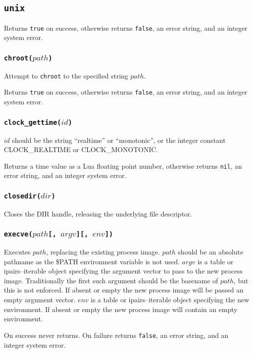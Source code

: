 \documentclass[11pt, oneside]{memoir}
\newcommand*{\true}[0]{\texttt{true}\xspace}
\newcommand*{\false}[0]{\texttt{false}\xspace}
\newcommand*{\nil}[0]{\texttt{nil}\xspace}
\newcommand*{\syscall}[1]{\texttt{#1}\xspace}
\newcommand*{\fn}[1]{\texttt{#1}\xspace}
\newcounter{toccols}
\newenvironment{Module}[1]{
	\subsection{\texttt{#1}}
	\addtocontents{toc}{
		\protect\begin{multicols}{\value{toccols}}
	}
}{
	\addtocontents{toc}{\protect\end{multicols}}
}
\begin{document}
\begin{Module}{unix}
Returns \true on success, otherwise returns \false, an error string, and an integer system error.

\subsubsection[\fn{chroot}]{\fn{chroot($path$)}}

Attempt to \syscall{chroot} to the specified string $path$.

Returns \true on success, otherwise returns \false, an error string, and an integer system error.

\subsubsection[\fn{clock\_gettime}]{\fn{clock\_gettime($id$)}}

$id$ should be the string ``realtime'' or ``monotonic'', or the integer constant CLOCK\_REALTIME or CLOCK\_MONOTONIC.

Returns a time value as a Lua floating point number, otherwise returns \nil, an error string, and an integer system error.

\subsubsection[\fn{closedir}]{\fn{closedir($dir$)}}

Closes the DIR handle, releasing the underlying file descriptor.

\subsubsection[\fn{execve}]{\fn{execve($path$[, $argv$][, $env$])}}

Executes $path$, replacing the existing process image. $path$ should be an absolute pathname as the \$PATH environment variable is not used. $argv$ is a table or ipairs--iterable object specifying the argument vector to pass to the new process image. Traditionally the first such argument should be the basename of $path$, but this is not enforced. If absent or empty the new process image will be passed an empty argument vector. $env$ is a table or ipairs--iterable object specifying the new environment. If absent or empty the new process image will contain an empty environment.

On success never returns. On failure returns \false, an error string, and an integer system error.


\end{Module}
\end{document}
